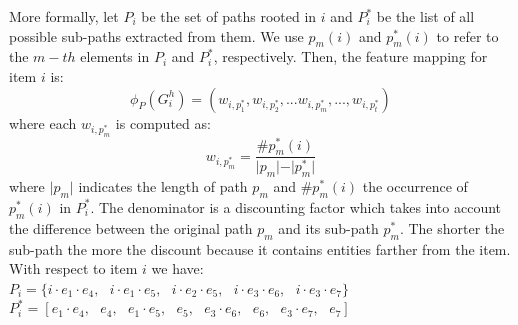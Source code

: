 More formally, let $P_i$ be the set of paths rooted in $i$ and $P^*_i$ be the list of all possible sub-paths extracted from them. We use $p_m(i)$ and $p^*_m(i)$ to refer to the $m-th$ elements in $P_i$ and $P^*_i$, respectively. Then, the feature mapping for item $i$ is:
\[
\phi_P(G^h_i)=(w_{i,p^*_1} ,w_{i,p^*_2} ,...w_{i,p^*_m} ,...,w_{i,p^*_t} )
\]
where each $w_{i,p^*_m}$%
is computed as:
\[
w_{i,p^*_m}=  \frac{ \# p^*_m(i) }{ \vert p_m \vert - \vert p^*_m \vert} 
\] 
where $\vert p_m \vert$ indicates the length of path $p_m$ and $\# p^*_m(i)$ the occurrence of $p^*_m(i)$ in $P^*_i$. The denominator is a discounting factor which takes into account the difference between the original path $p_m$ and its sub-path $p^*_m$. The shorter the sub-path the more the discount because it contains entities farther from the item. 
\\With respect to item $i$ we have:\\
$P_i= \lbrace i \cdot e_1 \cdot e_4,\text{ }i \cdot e_1 \cdot e_5,\text{ } i \cdot e_2 \cdot e_5,\text{ } i \cdot e_3 \cdot e_6,\text{ } i \cdot e_3 \cdot e_7 \rbrace$\\
$P^*_i= [ e_1 \cdot e_4,\text{ } e_4,\text{ } e_1 \cdot e_5,\text{ }e_5,\text{ } e_3 \cdot e_6,\text{ } e_6
,\text{ } e_3 \cdot e_7,\text{ } e_7 ]$

